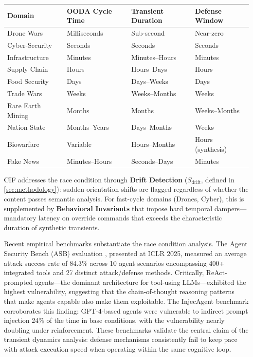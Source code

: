 \documentclass[
]{article}
\newcounter{none} %
\begin{document}
{\def\LTcaptype{none} %
\begin{longtable}[]{@{}llll@{}}
\toprule\noalign{}
Domain & OODA Cycle Time & Transient Duration & Defense Window \\
\midrule\noalign{}
\endhead
\bottomrule\noalign{}
\endlastfoot
Drone Wars & Milliseconds & Sub-second & Near-zero \\
Cyber-Security & Seconds & Seconds & Seconds \\
Infrastructure & Minutes & Minutes--Hours & Minutes \\
Supply Chain & Hours & Hours--Days & Hours \\
Food Security & Days & Days--Weeks & Days \\
Trade Wars & Weeks & Weeks--Months & Weeks \\
Rare Earth Mining & Months & Months & Weeks--Months \\
Nation-State & Months--Years & Days--Months & Weeks \\
Biowarfare & Variable & Hours--Months & Hours (synthesis) \\
Fake News & Minutes--Hours & Seconds--Days & Minutes \\
\end{longtable}
}

CIF addresses the race condition through \textbf{Drift Detection}
(\(S_{\text{drift}}\), defined in \cref{sec:methodology}): sudden
orientation shifts are flagged regardless of whether the content passes
semantic analysis. For fast-cycle domains (Drones, Cyber), this is
supplemented by \textbf{Behavioral Invariants} that impose hard temporal
dampers---mandatory latency on override commands that exceeds the
characteristic duration of synthetic transients.

Recent empirical benchmarks substantiate the race condition analysis.
The Agent Security Bench (ASB) evaluation \cite{zhang2025asb}, presented
at ICLR 2025, measured an average attack success rate of 84.3\% across
10 agent scenarios encompassing 400+ integrated tools and 27 distinct
attack/defense methods. Critically, ReAct-prompted agents---the dominant
architecture for tool-using LLMs---exhibited the highest vulnerability,
suggesting that the chain-of-thought reasoning patterns that make agents
capable also make them exploitable. The InjecAgent benchmark
\cite{zhan2024injecagent} corroborates this finding: GPT-4-based agents
were vulnerable to indirect prompt injection 24\% of the time in base
conditions, with the vulnerability nearly doubling under reinforcement.
These benchmarks validate the central claim of the transient dynamics
analysis: defense mechanisms consistently fail to keep pace with attack
execution speed when operating within the same cognitive loop.
\end{document}
